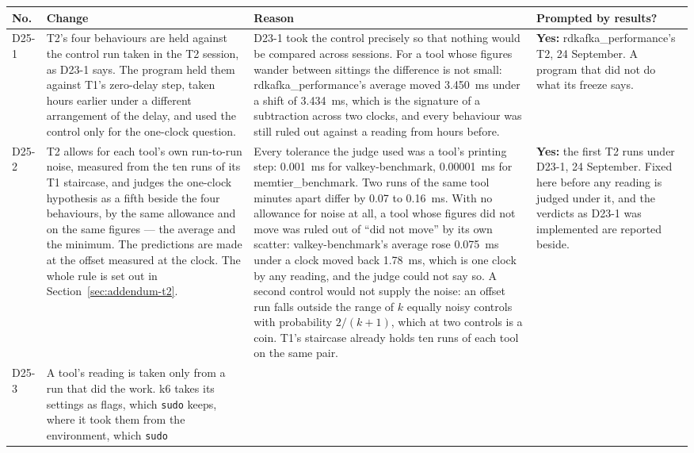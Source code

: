 \documentclass[11pt]{article}
\begin{document}
{\small
\begin{longtable}{@{}p{1.1cm} >{\raggedright\arraybackslash}p{6.1cm} >{\raggedright\arraybackslash}p{6.0cm} >{\raggedright\arraybackslash}p{2.2cm}@{}}
\toprule
\textbf{No.} & \textbf{Change} & \textbf{Reason} & \textbf{Prompted by results?} \\
\midrule
\endhead
D25-1 & T2's four behaviours are held against the control run taken in the T2 session, as D23-1
says. The program held them against T1's zero-delay step, taken hours earlier under a different
arrangement of the delay, and used the control only for the one-clock question. & D23-1 took
the control precisely so that nothing would be compared across sessions. For a tool whose
figures wander between sittings the difference is not small: rdkafka\_performance's average
moved 3.450~ms under a shift of 3.434~ms, which is the signature of a subtraction across two
clocks, and every behaviour was still ruled out against a reading from hours before. &
\textbf{Yes:} rdkafka\_performance's T2, 24 September. A program that did not do what its
freeze says. \\
D25-2 & T2 allows for each tool's own run-to-run noise, measured from the ten runs of its T1
staircase, and judges the one-clock hypothesis as a fifth beside the four behaviours, by the
same allowance and on the same figures --- the average and the minimum. The predictions are
made at the offset measured at the clock. The whole rule is set out in
Section~\ref{sec:addendum-t2}. & Every tolerance the judge used was a tool's printing step:
0.001~ms for valkey-benchmark, 0.00001~ms for memtier\_benchmark. Two runs of the same tool
minutes apart differ by 0.07 to 0.16~ms. With no allowance for noise at all, a tool whose
figures did not move was ruled out of ``did not move'' by its own scatter: valkey-benchmark's
average rose 0.075~ms under a clock moved back 1.78~ms, which is one clock by any reading, and
the judge could not say so. A second control would not supply the noise: an offset run falls
outside the range of $k$ equally noisy controls with probability $2/(k+1)$, which at two
controls is a coin. T1's staircase already holds ten runs of each tool on the same pair. &
\textbf{Yes:} the first T2 runs under D23-1, 24 September. Fixed here before any reading is
judged under it, and the verdicts as D23-1 was implemented are reported beside. \\
D25-3 & A tool's reading is taken only from a run that did the work. k6 takes its settings as
flags, which \texttt{sudo} keeps, where it took them from the environment, which \texttt{sudo}

\end{longtable}}
\end{document}

